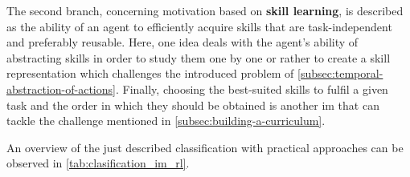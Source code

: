 \documentclass[draft,final]{vutinfth} %
\begin{document}
    The second branch, concerning motivation based on \textbf{skill learning}, is described as the ability of an agent to efficiently acquire skills that are task-independent and preferably reusable.
    Here, one idea deals with the agent's ability of abstracting skills in order to study them one by one or rather to create a skill representation which challenges the introduced problem of \autoref{subsec:temporal-abstraction-of-actions}.
    Finally, choosing the best-suited skills to fulfil a given task and the order in which they should be obtained is another \gls{im} that can tackle the challenge mentioned in \autoref{subsec:building-a-curriculum}.

    An overview of the just described classification with practical approaches can be observed in \autoref{tab:clasification_im_rl}.
\end{document}
